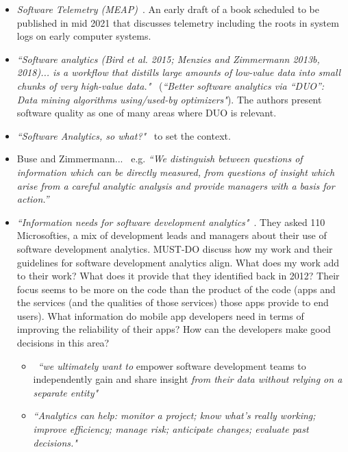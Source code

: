\begin{itemize}
    
    \item \emph{Software Telemetry (MEAP)}~\citep{riedesel2020_software_telemetry_meap_v04}. An early draft of a book scheduled to be published in mid 2021 that discusses telemetry including the roots in system logs on early computer systems.
    
    \item \emph{``Software analytics (Bird et al. 2015; Menzies and Zimmermann 2013b, 2018)... is a workflow that distills large amounts of low-value data into small chunks of very high-value data."}~\citep[page 2110]{agrawal2020_better_software_analytics_via_duo} (\emph{``Better software analytics via “DUO”: Data mining algorithms using/used-by optimizers"}). The authors present software quality as one of many areas where DUO is relevant. %
    
    \item \emph{``Software Analytics, so what?"}~\citep{menzies2013_software_analytics_so_what} to set the context.
    
    
    \item Buse and Zimmermann...~\cite{buse_analytics_2010} e.g. \emph{“We distinguish between questions of information which can be directly measured, from questions of insight which arise from a careful analytic analysis and provide managers with a basis for action.”}
    
    \item \emph{``Information needs for software development analytics"}~\citep{buse2012_information_needs_for_software_development_analytics}. They asked 110 Microsofties, a mix of development leads and managers about their use of software development analytics. MUST-DO discuss how my work and their guidelines for software development analytics align. What does my work add to their work? What does it provide that they identified back in 2012? Their focus seems to be more on the code than the product of the code (apps and the services (and the qualities of those services) those apps provide to end users). What information do mobile app developers need in terms of improving the reliability of their apps? How can the developers make good decisions in this area?
    \begin{itemize}
        \item ~\emph{``we ultimately want to} empower software development teams to independently gain and share insight \emph{from their data without relying on a separate entity"}
        \item \emph{``Analytics can help: monitor a project; know what's really working; improve efficiency; manage risk; anticipate changes; evaluate past decisions."}
        

\end{itemize}
\end{itemize}
